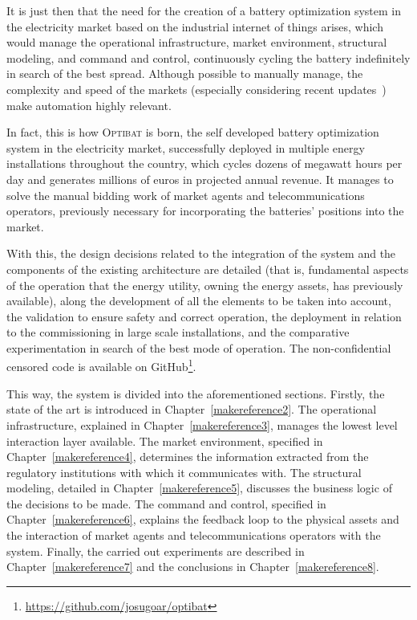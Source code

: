 It is just then that the need for the creation of a battery optimization system in the electricity market based on the industrial internet of things arises, which would manage the operational infrastructure, market environment, structural modeling, and command and control, continuously cycling the battery indefinitely in search of the best spread. Although possible to manually manage, the complexity and speed of the markets (especially considering recent updates~\cite{cnmc2025resolucion, omie2025instruccion}) make automation highly relevant.

In fact, this is how \textsc{Optibat} is born, the self developed battery optimization system in the electricity market, successfully deployed in multiple energy installations throughout the country, which cycles dozens of megawatt hours per day and generates millions of euros in projected annual revenue. It manages to solve the manual bidding work of market agents and telecommunications operators, previously necessary for incorporating the batteries' positions into the market.

With this, the design decisions related to the integration of the system and the components of the existing architecture are detailed (that is, fundamental aspects of the operation that the energy utility, owning the energy assets, has previously available), along the development of all the elements to be taken into account, the validation to ensure safety and correct operation, the deployment in relation to the commissioning in large scale installations, and the comparative experimentation in search of the best mode of operation. The non-confidential censored code is available on GitHub\footnote{\url{https://github.com/josugoar/optibat}}.

This way, the system is divided into the aforementioned sections. Firstly, the state of the art is introduced in Chapter~\ref{makereference2}. The operational infrastructure, explained in Chapter~\ref{makereference3}, manages the lowest level interaction layer available. The market environment, specified in Chapter~\ref{makereference4}, determines the information extracted from the regulatory institutions with which it communicates with. The structural modeling, detailed in Chapter~\ref{makereference5}, discusses the business logic of the decisions to be made. The command and control, specified in Chapter~\ref{makereference6}, explains the feedback loop to the physical assets and the interaction of market agents and telecommunications operators with the system. Finally, the carried out experiments are described in Chapter~\ref{makereference7} and the conclusions in Chapter~\ref{makereference8}.

